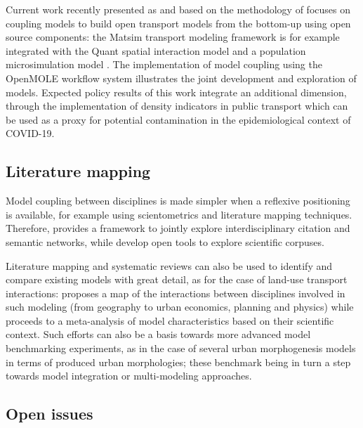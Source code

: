 Current work recently presented as \cite{raimbault2021estimating} and based on the methodology of \cite{raimbault2021building} focuses on coupling models to build open transport models from the bottom-up using open source components: the Matsim transport modeling framework \cite{horni2016multi} is for example integrated with the Quant spatial interaction model \cite{batty2021new} and a population microsimulation model \cite{lomax2017microsimulation}. The implementation of model coupling using the OpenMOLE workflow system \cite{passerat2017reproducible} illustrates the joint development and exploration of models. Expected policy results of this work integrate an additional dimension, through the implementation of density indicators in public transport which can be used as a proxy for potential contamination in the epidemiological context of COVID-19.



\subsection{Literature mapping}

Model coupling between disciplines is made simpler when a reflexive positioning is available, for example using scientometrics and literature mapping techniques. Therefore, \cite{raimbault2019exploration} provides a framework to jointly explore interdisciplinary citation and semantic networks, while \cite{raimbault2021empowering} develop open tools to explore scientific corpuses. 

Literature mapping and systematic reviews can also be used to identify and compare existing models with great detail, as for the case of land-use transport interactions: \cite{raimbault2021interdisciplinary} proposes a map of the interactions between disciplines involved in such modeling (from geography to urban economics, planning and physics) while \cite{raimbault2019meta} proceeds to a meta-analysis of model characteristics based on their scientific context. Such efforts can also be a basis towards more advanced model benchmarking experiments, as \cite{raimbault2020comparison} in the case of several urban morphogenesis models in terms of produced urban morphologies; these benchmark being in turn a step towards model integration or multi-modeling approaches.

\subsection{Open issues}

